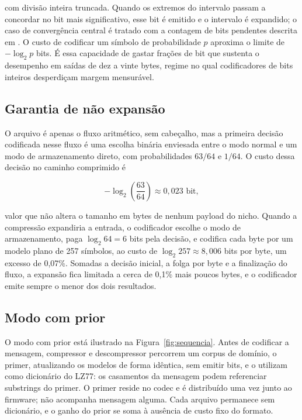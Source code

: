 \documentclass[12pt]{article}
\begin{document}
com divisão inteira truncada. Quando os extremos do intervalo passam a concordar
no bit mais significativo, esse bit é emitido e o intervalo é expandido; o caso
de convergência central é tratado com a contagem de bits pendentes descrita
em \cite{witten:87}. O custo de codificar um símbolo de probabilidade $p$
aproxima o limite de $-\log_2 p$ bits. É essa capacidade de gastar frações de
bit que sustenta o desempenho em saídas de dez a vinte bytes, regime no qual
codificadores de bits inteiros desperdiçam margem mensurável.

\subsection{Garantia de não expansão}

O arquivo é apenas o fluxo aritmético, sem cabeçalho, mas a primeira decisão
codificada nesse fluxo é uma escolha binária enviesada entre o modo normal e um
modo de armazenamento direto, com probabilidades $63/64$ e $1/64$. O custo dessa
decisão no caminho comprimido é

\begin{equation}
-\log_2\left(\frac{63}{64}\right) \approx 0{,}023 \text{ bit},
\end{equation}

valor que não altera o tamanho em bytes de nenhum payload do nicho. Quando a
compressão expandiria a entrada, o codificador escolhe o modo de armazenamento,
paga $\log_2 64 = 6$ bits pela decisão, e codifica cada byte por um modelo plano
de 257 símbolos, ao custo de $\log_2 257 \approx 8{,}006$ bits por byte, um
excesso de 0,07\%. Somadas a decisão inicial, a folga por byte e a finalização
do fluxo, a expansão fica limitada a cerca de 0,1\% mais poucos bytes, e o
codificador emite sempre o menor dos dois resultados.

\subsection{Modo com prior}
\label{sec:primed}

O modo com prior está ilustrado na Figura~\ref{fig:sequencia}. Antes de
codificar a mensagem, compressor e descompressor percorrem um corpus de domínio,
o primer, atualizando os modelos de forma idêntica, sem emitir bits, e o utilizam
como dicionário do LZ77: os casamentos da mensagem podem referenciar substrings
do primer. O primer reside no codec e é distribuído uma vez junto ao firmware;
não acompanha mensagem alguma. Cada arquivo permanece sem dicionário, e o ganho
do prior se soma à ausência de custo fixo do formato.
\end{document}

